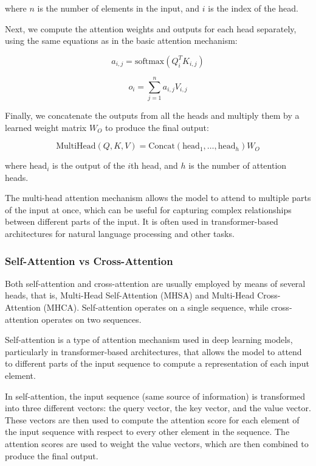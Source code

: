 where $n$ is the number of elements in the input, and $i$ is the index of the head.

Next, we compute the attention weights and outputs for each head separately, using the same equations as in the basic attention mechanism:

\begin{equation}
	a_{i,j} = \text{softmax}(Q_i^T K_{i,j})
\end{equation}

\begin{equation}
	o_{i} = \sum_{j=1}^{n} a_{i,j} V_{i,j}
\end{equation}

Finally, we concatenate the outputs from all the heads and multiply them by a learned weight matrix $W_{O}$ to produce the final output:

\begin{equation}
	\text{MultiHead}(Q, K, V) = \text{Concat}(\text{head}_1, \dots, \text{head}_h)W_{O}
\end{equation}

where $\text{head}_i$ is the output of the $i$th head, and $h$ is the number of attention heads.

The multi-head attention mechanism allows the model to attend to multiple parts of the input at once, which can be useful for capturing complex relationships between different parts of the input. It is often used in transformer-based architectures for natural language processing and other tasks.

\subsubsection{Self-Attention vs Cross-Attention}
\label{subsubsec:3_self_attention_vs_cross_attention}

Both self-attention and cross-attention are usually employed by means of several heads, that is, Multi-Head Self-Attention (MHSA) and Multi-Head Cross-Attention (MHCA). Self-attention operates on a single sequence, while cross-attention operates on two sequences. 

Self-attention is a type of attention mechanism used in deep learning models, particularly in transformer-based architectures, that allows the model to attend to different parts of the input sequence to compute a representation of each input element.

In self-attention, the input sequence (same source of information) is transformed into three different vectors: the query vector, the key vector, and the value vector. These vectors are then used to compute the attention score for each element of the input sequence with respect to every other element in the sequence. The attention scores are used to weight the value vectors, which are then combined to produce the final output.

